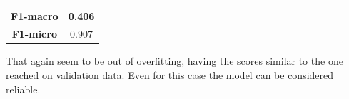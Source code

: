 \begin{center}
	\begin{tabular}{ | c | c | } 
		\hline
		\textbf{F1-macro} & 0.406 \\
		\hline
		\textbf{F1-micro} & 0.907 \\ 
		\hline
	\end{tabular}
\end{center}

That again seem to be out of overfitting, having the scores similar to the one reached on validation data. Even for this case the model can be considered reliable.

